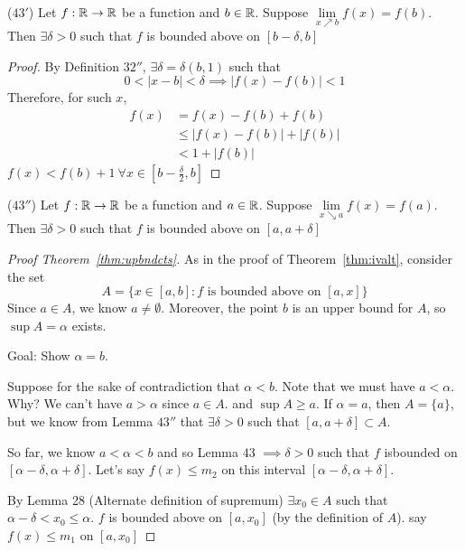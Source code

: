 \begin{lemma*}($43'$)
    Let $f: \mathbb R \to \mathbb R$ be a function and $b \in \mathbb R$.
    Suppose $\lim\limits_{x \nearrow b} f(x) = f(b)$. 
    Then $\exists \delta > 0$ such that $f$ is bounded above on $\left[b-\delta, b\right]$
\end{lemma*}

\begin{proof}
    By Definition $32''$, $\exists \delta = \delta(b, 1)$ such that
    $$0 < |x-b| < \delta \implies |f(x) - f(b)| < 1$$
    Therefore, for such $x$, 
    \begin{align*}
        f(x) &= f(x) - f(b) + f(b) \\
        &\leq |f(x) - f(b)| + |f(b)| \\
        &< 1 + |f(b)|
    \end{align*}
    $f(x) < f(b) + 1\ \forall x \in \left[b-\frac{\delta}{2}, b\right]$
\end{proof}

\begin{lemma*}($43''$)
    Let $f: \mathbb R \to \mathbb R$ be a function and $a \in \mathbb R$.
    Suppose $\lim\limits_{x \searrow a} f(x) = f(a)$. 
    Then $\exists \delta > 0$ such that $f$ is bounded above on $\left[a, a+\delta\right]$
\end{lemma*}

\begin{proof}[Proof Theorem~\ref{thm:upbndcts}]
    As in the proof of Theorem~\ref{thm:ivalt}, consider the set
    $$A = \{ x \in \left[a, b\right] : f \text{ is bounded above on }\left[a, x\right]\}$$
    Since $a \in A$, we know $a \neq \emptyset$.
    Moreover, the point $b$ is an upper bound for $A$, so $\sup A = \alpha$ exists.

    Goal: Show $\alpha = b$.

    Suppose for the sake of contradiction that $\alpha < b$.
    Note that we must have $a < \alpha$. Why?
    We can't have $a > \alpha$ since $a \in A$. and $\sup A \geq a$.
    If $\alpha = a$, then $A = \{a\}$, but we know from Lemma $43''$ that
    $\exists \delta > 0$ such that $\left[a, a+\delta\right] \subset A$.

    So far, we know $a < \alpha < b$ and so Lemma $43$ $\implies \delta > 0$ such that
    $f$ isbounded on $\left[\alpha - \delta, \alpha + \delta\right]$.
    Let's say $f(x) \leq m_2$ on this interval $\left[\alpha - \delta, \alpha + \delta\right]$.

    By Lemma 28 (Alternate definition of supremum)
    $\exists x_0 \in A$ such that $\alpha - \delta < x_0 \leq \alpha$.
    $f$ is bounded above on $\left[a, x_0\right]$ (by the definition of $A$).
    say $f(x) \leq m_1$ on $\left[a, x_0\right]$
\end{proof}